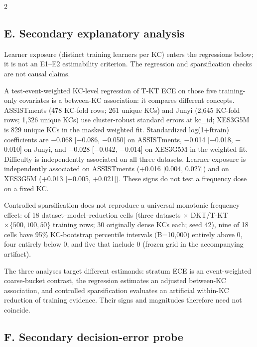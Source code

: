 \documentclass[10pt,a4paper]{article}
\begin{document}
\vspace{0.55em}
\begin{multicols}{2}


\subsection*{E. Secondary explanatory analysis}

Learner exposure (distinct training learners per KC) enters the regressions below; it is not an E1--E2 estimability criterion. The regression and sparsification checks are not causal claims.

A test-event-weighted KC-level regression of T-KT ECE on those five training-only covariates is a between-KC association: it compares different concepts. ASSISTments (478 KC-fold rows; 261 unique KCs) and Junyi (2,645 KC-fold rows; 1,326 unique KCs) use cluster-robust standard errors at kc\_id; XES3G5M is 829 unique KCs in the masked weighted fit. Standardized log(1+ftrain) coefficients are $-$0.068 [$-$0.086, $-$0.050] on ASSISTments, $-$0.014 [$-$0.018, $-$0.010] on Junyi, and $-$0.028 [$-$0.042, $-$0.014] on XES3G5M in the weighted fit. Difficulty is independently associated on all three datasets. Learner exposure is independently associated on ASSISTments (+0.016 [0.004, 0.027]) and on XES3G5M (+0.013 [+0.005, +0.021]). These signs do not test a frequency dose on a fixed KC.

Controlled sparsification does not reproduce a universal monotonic frequency effect: of 18 dataset--model--reduction cells (three datasets $\times$ DKT/T-KT $\times\{500, 100, 50\}$ training rows; 30 originally dense KCs each; seed 42), nine of 18 cells have 95\% KC-bootstrap percentile intervals (B=10,000) entirely above 0, four entirely below 0, and five that include 0 (frozen grid in the accompanying artifact).

The three analyses target different estimands: stratum ECE is an event-weighted coarse-bucket contrast, the regression estimates an adjusted between-KC association, and controlled sparsification evaluates an artificial within-KC reduction of training evidence. Their signs and magnitudes therefore need not coincide.

\subsection*{F. Secondary decision-error probe}


\end{multicols}
\end{document}
